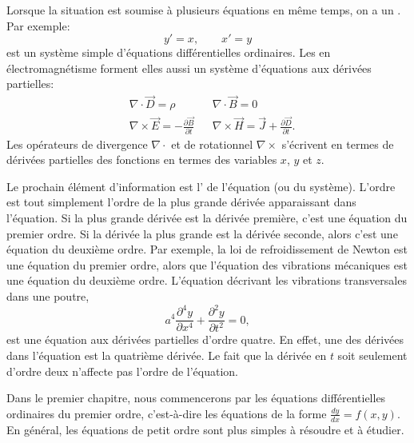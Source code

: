 Lorsque la situation est soumise à plusieurs équations en même temps, on a un
\emph{}.  
Par exemple: 
\begin{equation*}
	y' = x , \qquad x' = y
\end{equation*}
est un système simple d'équations différentielles ordinaires.
Les  en électromagnétisme forment elles aussi un système d'équations aux dérivées partielles:
\begin{align*}
	& \nabla \cdot \vec{D} = \rho & & \nabla \cdot \vec{B} = 0  \\
	& \nabla \times \vec{E} = - \frac{\partial \vec{B}}{\partial t} &
	& \nabla \times \vec{H} = \vec{J} + \frac{\partial \vec{D}}{\partial t} .
\end{align*}
Les opérateurs de divergence $\nabla \cdot$ et de rotationnel $\nabla \times$ s'écrivent en termes de dérivées partielles des fonctions en termes des variables $x$, $y$ et $z$.

\medskip

Le prochain élément d'information est l'\emph{} de l'équation (ou du système).   L'ordre est tout simplement l'ordre de la plus grande dérivée apparaissant dans l'équation.  Si la plus grande dérivée est la dérivée première, c'est une équation du premier ordre.  Si la dérivée la plus grande est la dérivée seconde, alors c'est une équation du deuxième ordre.  Par exemple, la loi de refroidissement de Newton est une équation du premier ordre, alors que l'équation des vibrations mécaniques est une équation du deuxième ordre.  L'équation décrivant les vibrations transversales dans une poutre, 
\begin{equation*}
	a^4 \frac{\partial^4 y}{\partial x^4} + \frac{\partial^2 y}{\partial t^2} = 0,
\end{equation*}
est une équation aux dérivées partielles d'ordre quatre.  En effet, une des dérivées dans l'équation est la quatrième dérivée.  Le fait que la dérivée en $t$ soit seulement d'ordre deux n'affecte pas l'ordre de l'équation.

Dans le premier chapitre, nous commencerons par les équations différentielles ordinaires du premier ordre, c'est-à-dire les équations de la forme $\frac{dy}{dx} = f(x,y)$.  En général, les équations de petit ordre sont plus simples à résoudre et à étudier.

\medskip

